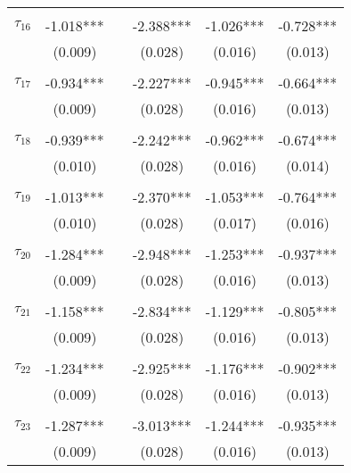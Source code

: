 \begin{tabular}{@{\extracolsep{-5pt}}lccccc}
                &           &&           &           &           \\[-2.1ex]
$\tau_{16}$     & -1.018*** && -2.388*** & -1.026*** & -0.728*** \\
                &  (0.009)  &&  (0.028)  &  (0.016)  &  (0.013)  \\
                &           &&           &           &           \\[-2.1ex]
$\tau_{17}$     & -0.934*** && -2.227*** & -0.945*** & -0.664*** \\
                &  (0.009)  &&  (0.028)  &  (0.016)  &  (0.013)  \\
                &           &&           &           &           \\[-2.1ex]
$\tau_{18}$     & -0.939*** && -2.242*** & -0.962*** & -0.674*** \\
                &  (0.010)  &&  (0.028)  &  (0.016)  &  (0.014)  \\
                &           &&           &           &           \\[-2.1ex]
$\tau_{19}$     & -1.013*** && -2.370*** & -1.053*** & -0.764*** \\
                &  (0.010)  &&  (0.028)  &  (0.017)  &  (0.016)  \\
                &           &&           &           &           \\[-2.1ex]
$\tau_{20}$     & -1.284*** && -2.948*** & -1.253*** & -0.937*** \\
                &  (0.009)  &&  (0.028)  &  (0.016)  &  (0.013)  \\
                &           &&           &           &           \\[-2.1ex]
$\tau_{21}$     & -1.158*** && -2.834*** & -1.129*** & -0.805*** \\
                &  (0.009)  &&  (0.028)  &  (0.016)  &  (0.013)  \\
                &           &&           &           &           \\[-2.1ex]
$\tau_{22}$     & -1.234*** && -2.925*** & -1.176*** & -0.902*** \\
                &  (0.009)  &&  (0.028)  &  (0.016)  &  (0.013)  \\
                &           &&           &           &           \\[-2.1ex]
$\tau_{23}$     & -1.287*** && -3.013*** & -1.244*** & -0.935*** \\
                &  (0.009)  &&  (0.028)  &  (0.016)  &  (0.013)  \\

\end{tabular}

